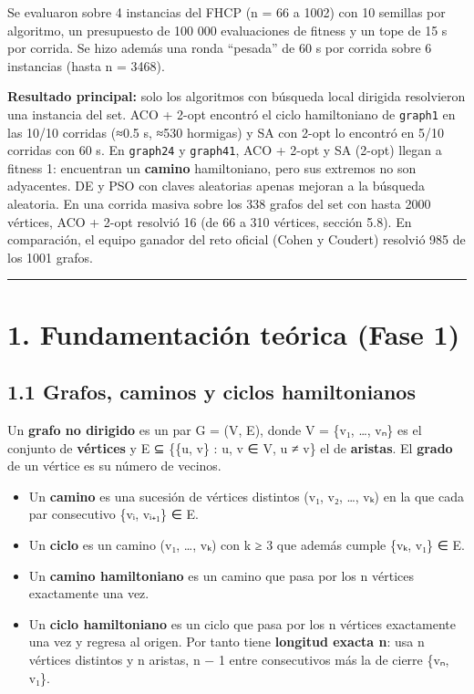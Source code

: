 \documentclass[
  spanish,
  11pt,
]{article}
\providecommand{\tightlist}{%
  \setlength{\itemsep}{0pt}\setlength{\parskip}{0pt}}
\begin{document}
Se evaluaron sobre 4 instancias del FHCP (n = 66 a 1002) con 10 semillas
por algoritmo, un presupuesto de 100 000 evaluaciones de fitness y un
tope de 15 s por corrida. Se hizo además una ronda ``pesada'' de 60 s
por corrida sobre 6 instancias (hasta n = 3468).

\textbf{Resultado principal:} solo los algoritmos con búsqueda local
dirigida resolvieron una instancia del set. ACO + 2-opt encontró el
ciclo hamiltoniano de \texttt{graph1} en las 10/10 corridas (≈0.5 s,
≈530 hormigas) y SA con 2-opt lo encontró en 5/10 corridas con 60 s. En
\texttt{graph24} y \texttt{graph41}, ACO + 2-opt y SA (2-opt) llegan a
fitness 1: encuentran un \textbf{camino} hamiltoniano, pero sus extremos
no son adyacentes. DE y PSO con claves aleatorias apenas mejoran a la
búsqueda aleatoria. En una corrida masiva sobre los 338 grafos del set
con hasta 2000 vértices, ACO + 2-opt resolvió 16 (de 66 a 310 vértices,
sección 5.8). En comparación, el equipo ganador del reto oficial (Cohen y
Coudert) resolvió 985 de los 1001 grafos.

\begin{center}\rule{0.5\linewidth}{0.5pt}\end{center}

\section{1. Fundamentación teórica (Fase
1)}\label{fundamentaciuxf3n-teuxf3rica-fase-1}

\subsection{1.1 Grafos, caminos y ciclos
hamiltonianos}\label{grafos-caminos-y-ciclos-hamiltonianos}

Un \textbf{grafo no dirigido} es un par G = (V, E), donde V = \{v₁,
\ldots, vₙ\} es el conjunto de \textbf{vértices} y E ⊆ \{\{u, v\} : u, v
∈ V, u ≠ v\} el de \textbf{aristas}. El \textbf{grado} de un vértice es
su número de vecinos.

\begin{itemize}
\tightlist
\item
  Un \textbf{camino} es una sucesión de vértices distintos (v₁, v₂,
  \ldots, vₖ) en la que cada par consecutivo \{vᵢ, vᵢ₊₁\} ∈ E.
\item
  Un \textbf{ciclo} es un camino (v₁, \ldots, vₖ) con k ≥ 3 que además
  cumple \{vₖ, v₁\} ∈ E.
\item
  Un \textbf{camino hamiltoniano} es un camino que pasa por los n
  vértices exactamente una vez.
\item
  Un \textbf{ciclo hamiltoniano} es un ciclo que pasa por los n vértices
  exactamente una vez y regresa al origen. Por tanto tiene
  \textbf{longitud exacta n}: usa n vértices distintos y n aristas, n −
  1 entre consecutivos más la de cierre \{vₙ, v₁\}.
\end{itemize}
\end{document}
